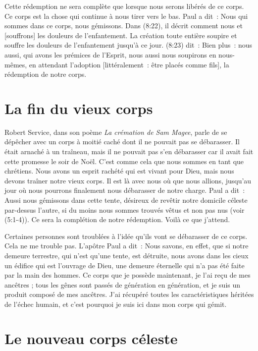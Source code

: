 Cette rédemption ne sera complète que lorsque nous serons libérés
 de ce corps.
 Ce corps est la chose qui continue à nous tirer vers le bas.
 Paul a dit~:
 \og Nous qui sommes dans ce corps, nous gémissons. \fg{}
 Dans (8:22), il décrit comment nous
 \og [soupirons] et [souffrons] les douleurs de l'enfantement. \fg{}
 La création toute entière soupire et souffre
 les douleurs de l'enfantement jusqu'à ce jour.
 (8:23) dit~:
 \og Bien plus~: nous aussi, qui avons les prémices de l'Esprit,
 nous aussi nous soupirons en nous-mêmes, en attendant l'adoption
 [littéralement~: être placés comme fils],
 la rédemption de notre corps. \fg{}


\section*{La fin du vieux corps}

Robert Service, dans son poème \emph{La crémation de Sam Magee},
 parle de se dépêcher \og avec un corps à moitié caché
 dont il ne pouvait pas se débarasser. \fg{}
 Il était arnaché à un traîneau, mais il ne pouvait pas s'en débarasser
 car il avait fait cette promesse le soir de Noël.
 C'est comme cela que nous sommes en tant que chrétiens.
 Nous avons un esprit rachété qui est vivant pour Dieu,
 mais nous devons traîner notre vieux corps.
 Il est là avec nous où que nous allions, jusqu'au jour où nous pourrons
 finalement nous débarasser de notre charge. Paul a dit~:
 \og Aussi nous gémissons dans cette tente, désireux de revêtir
 notre domicile céleste par-dessus l'autre, si du moins nous sommes
 trouvés vêtus et non pas nus \fg{} (voir (5:1-4)).
 Ce sera la complétion de notre rédemption. Voilà ce que j'attend.

Certaines personnes sont troublées
 à l'idée qu'ils vont se débarasser de ce corps. Cela ne me trouble pas.
 L'apôtre Paul a dit~:
 \og  Nous savons, en effet, que si notre demeure terrestre,
 qui n'est qu'une tente, est détruite, nous avons dans les cieux
 un édifice qui est l'ouvrage de Dieu, une demeure éternelle
 qui n'a pas été faite par la main des hommes. \fg{}
 Ce corps que je possède maintenant, je l'ai reçu de mes ancêtres ;
 tous les gênes sont passés de génération en génération,
 et je suis un produit composé de mes ancêtres.
 J'ai récupéré toutes les caractéristiques héritées de l'échec humain,
 et c'est pourquoi je suis ici dans mon corps qui gémit.


\section*{Le nouveau corps céleste}


